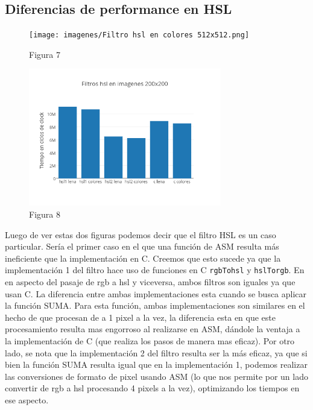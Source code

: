 \documentclass[a4paper]{article}
\begin{document}
\subsection{Diferencias de performance en HSL}

\begin{figure}[h]
  \centering
    \texttt{[image: imagenes/Filtro  hsl en colores 512x512.png]}
  \caption{Figura 7}
  \label{fig:graficohsl1}
\end{figure}
 \FloatBarrier

\begin{figure}[h]
  \centering
    \includegraphics[width=0.75\textwidth]{imagenes/Filtros hsl en imagenes 200x200.png}
  \caption{Figura 8}
  \label{fig:graficohsl2}
\end{figure}
 \FloatBarrier

Luego de ver estas dos figuras podemos decir que el filtro HSL es un caso particular. Sería el primer caso en el que una función de ASM resulta más ineficiente que la implementación en C. Creemos que esto sucede ya que la implementación 1 del filtro hace uso de funciones en C {\tt rgbTohsl} y {\tt hslTorgb}. En en aspecto del pasaje de rgb a hsl y viceversa, ambos filtros son iguales ya que usan C. La diferencia entre ambas implementaciones esta cuando se busca aplicar la función SUMA. Para esta función, ambas implementaciones son similares en el hecho de que procesan de a 1 pixel a la vez, la diferencia esta en que este procesamiento resulta mas engorroso al realizarse en ASM, dándole la ventaja a la implementación de C (que realiza los pasos de manera mas eficaz).
Por otro lado, se nota que la implementación 2 del filtro resulta ser la más eficaz, ya que si bien la función SUMA resulta igual que en la implementación 1, podemos realizar las conversiones de formato de pixel usando ASM (lo que nos permite por un lado convertir de rgb a hsl procesando 4 pixels a la vez), optimizando los tiempos en ese aspecto.
 
\end{document}
